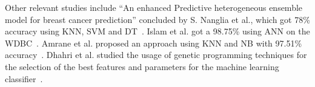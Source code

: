 Other relevant studies include “An enhanced Predictive heterogeneous ensemble model for breast cancer prediction” concluded by S. Nanglia et al., which got 78\% accuracy using KNN, SVM and DT~\cite{carte1}. Islam et al. got a 98.75\% using ANN on the WDBC~\cite{carte3}. Amrane et al. proposed an approach using KNN and NB with 97.51\% accuracy~\cite{carte4}. Dhahri et al. studied the usage of genetic programming techniques for the selection of the best features and parameters for the machine learning classifier~\cite{carte5}.